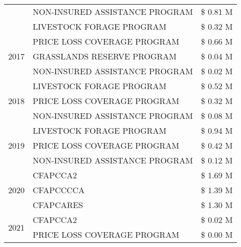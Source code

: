 \begin{tabular}{llr}
 & NON-INSURED ASSISTANCE PROGRAM & \$ 0.81 M \\
 & LIVESTOCK FORAGE PROGRAM & \$ 0.32 M \\
\cline{1-3}
\multirow[t]{3}{*}{2017} & PRICE LOSS COVERAGE PROGRAM & \$ 0.66 M \\
 & GRASSLANDS RESERVE PROGRAM & \$ 0.04 M \\
 & NON-INSURED ASSISTANCE PROGRAM & \$ 0.02 M \\
\cline{1-3}
\multirow[t]{3}{*}{2018} & LIVESTOCK FORAGE PROGRAM & \$ 0.52 M \\
 & PRICE LOSS COVERAGE PROGRAM & \$ 0.32 M \\
 & NON-INSURED ASSISTANCE PROGRAM & \$ 0.08 M \\
\cline{1-3}
\multirow[t]{3}{*}{2019} & LIVESTOCK FORAGE PROGRAM & \$ 0.94 M \\
 & PRICE LOSS COVERAGE PROGRAM & \$ 0.42 M \\
 & NON-INSURED ASSISTANCE PROGRAM & \$ 0.12 M \\
\cline{1-3}
\multirow[t]{3}{*}{2020} & CFAPCCA2 & \$ 1.69 M \\
 & CFAPCCCCA & \$ 1.39 M \\
 & CFAPCARES & \$ 1.30 M \\
\cline{1-3}
\multirow[t]{2}{*}{2021} & CFAPCCA2 & \$ 0.02 M \\
 & PRICE LOSS COVERAGE PROGRAM & \$ 0.00 M \\
\cline{1-3}
\bottomrule
\end{tabular}
